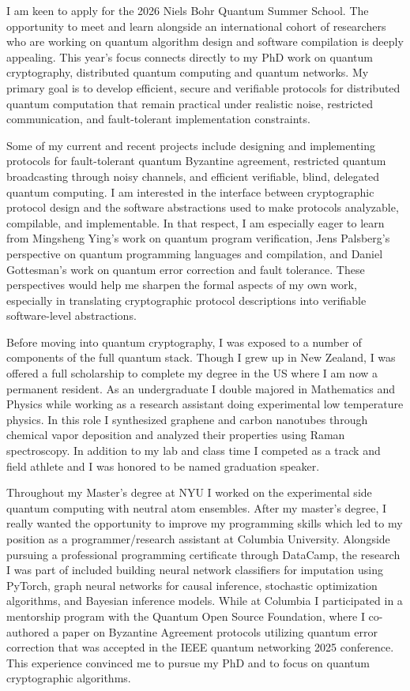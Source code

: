 I am keen to apply for the 2026 Niels Bohr Quantum Summer School. The opportunity to meet and learn alongside an international cohort of researchers who are working on quantum algorithm design and software compilation is deeply appealing. This year’s focus connects directly to my PhD work on quantum cryptography, distributed quantum computing and quantum networks. My primary goal is to develop efficient, secure and verifiable protocols for distributed quantum computation that remain practical under realistic noise, restricted communication, and fault-tolerant implementation constraints. 

Some of my current and recent projects include designing and implementing protocols for fault-tolerant quantum Byzantine agreement, restricted quantum broadcasting through noisy channels, and efficient verifiable, blind, delegated quantum computing. I am interested in the interface between cryptographic protocol design and the software abstractions used to make protocols analyzable, compilable, and implementable. In that respect, I am especially eager to learn from Mingsheng Ying’s work on quantum program verification, Jens Palsberg’s perspective on quantum programming languages and compilation, and Daniel Gottesman’s work on quantum error correction and fault tolerance. These perspectives would help me sharpen the formal aspects of my own work, especially in translating cryptographic protocol descriptions into verifiable software-level abstractions.

Before moving into quantum cryptography, I was exposed to a number of components of the full quantum stack. Though I grew up in New Zealand, I was offered a full scholarship to complete my degree in the US where I am now a permanent resident. As an undergraduate I double majored in Mathematics and Physics while working as a research assistant doing experimental low temperature physics. In this role I synthesized graphene and carbon nanotubes through chemical vapor deposition and analyzed their properties using Raman spectroscopy. In addition to my lab and class time I competed as a track and field athlete and I was honored to be named graduation speaker.

Throughout my Master's degree at NYU I worked on the experimental side quantum computing with neutral atom ensembles. After my master's degree, I really wanted the opportunity to improve my programming skills which led to my position as a programmer/research assistant at Columbia University. Alongside pursuing a professional programming certificate through DataCamp, the research I was part of included building neural network classifiers for imputation using PyTorch, graph neural networks for causal inference, stochastic optimization algorithms, and Bayesian inference models. While at Columbia I participated in a mentorship program with the Quantum Open Source Foundation, where I co-authored a paper on Byzantine Agreement protocols utilizing quantum error correction that was accepted in the IEEE quantum networking 2025 conference. This experience convinced me to pursue my PhD and to focus on quantum cryptographic algorithms.

